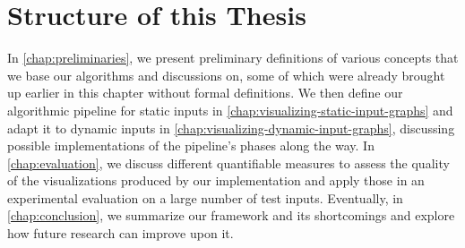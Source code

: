 \section{Structure of this Thesis}
\label{sect:structure-of-this-thesis}

In \cref{chap:preliminaries}, we present preliminary definitions of various concepts that we base our algorithms and discussions on, some of which were already brought up earlier in this chapter without formal definitions.
We then define our algorithmic pipeline for static inputs in \cref{chap:visualizing-static-input-graphs} and adapt it to dynamic inputs in \cref{chap:visualizing-dynamic-input-graphs}, discussing possible implementations of the pipeline's phases along the way.
In \cref{chap:evaluation}, we discuss different quantifiable measures to assess the quality of the visualizations produced by our implementation and apply those in an experimental evaluation on a large number of test inputs.
Eventually, in \cref{chap:conclusion}, we summarize our framework and its shortcomings and explore how future research can improve upon it.
